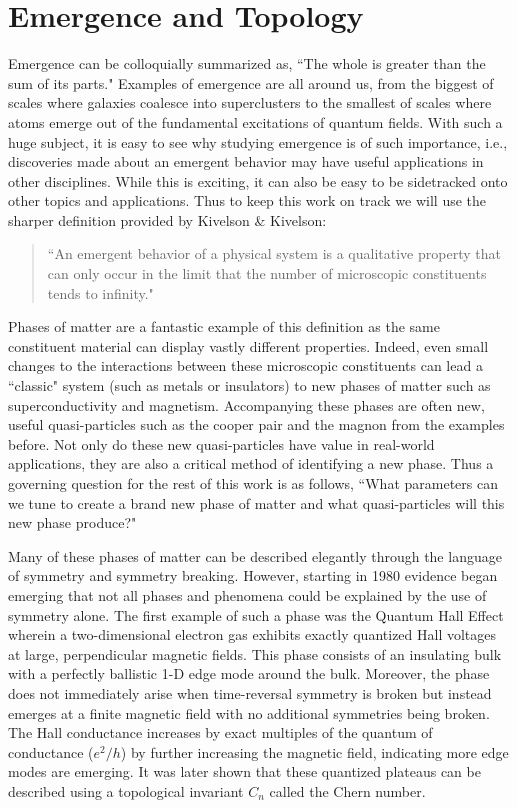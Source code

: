 \section{Emergence and Topology}
Emergence can be colloquially summarized as, ``The whole is greater than the sum of its parts." Examples of emergence are all around us, from the biggest of scales where galaxies coalesce into superclusters to the smallest of scales where atoms emerge out of the fundamental excitations of quantum fields. With such a huge subject, it is easy to see why studying emergence is of such importance, i.e., discoveries made about an emergent behavior may have useful applications in other disciplines. While this is exciting, it can also be easy to be sidetracked onto other topics and applications. Thus to keep this work on track we will use the sharper definition provided by Kivelson \& Kivelson:
\begin{quote}
	``An emergent behavior of a physical system is a qualitative property that can only occur in the limit that the number of microscopic constituents tends to infinity."\cite{Kivelson2016}
\end{quote}
Phases of matter are a fantastic example of this definition as the same constituent material can display vastly different properties. Indeed, even small changes to the interactions between these microscopic constituents can lead a ``classic" system (such as metals or insulators) to new phases of matter such as superconductivity and magnetism. Accompanying these phases are often new, useful quasi-particles such as the cooper pair and the magnon from the examples before. Not only do these new quasi-particles have value in real-world applications, they are also a critical method of identifying a new phase. Thus a governing question for the rest of this work is as follows, ``What parameters can we tune to create a brand new phase of matter and what quasi-particles will this new phase produce?"
\par 
Many of these phases of matter can be described elegantly through the language of symmetry and symmetry breaking\cite{Noether1918, Landau1937, pathria_beale_2022}. However, starting in 1980 evidence began emerging that not all phases and phenomena could be explained by the use of symmetry alone. The first example of such a phase was the Quantum Hall Effect wherein a two-dimensional electron gas exhibits exactly quantized Hall voltages at large, perpendicular magnetic fields\cite{Klitzing1980}. This phase consists of an insulating bulk with a perfectly ballistic 1-D edge mode around the bulk. Moreover, the phase does not immediately arise when time-reversal symmetry is broken but instead emerges at a finite magnetic field with no additional symmetries being broken. The Hall conductance increases by exact multiples of the quantum of conductance ($e^{2}/h$) by further increasing the magnetic field, indicating more edge modes are emerging\cite{Zhang2005}. It was later shown that these quantized plateaus can be described using a topological invariant $C_{n}$ called the Chern number.\cite{Thouless1982, Kohmoto1985, Avron1983, Niu1985}\par 
